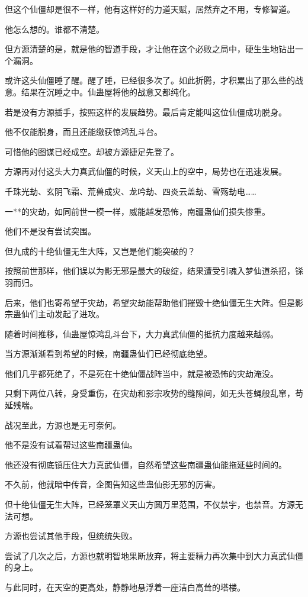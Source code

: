 \begin{this_body}
但这个仙僵却是很不一样，他有这样好的力道天赋，居然弃之不用，专修智道。

他怎么想的。谁都不清楚。

但方源清楚的是，就是他的智道手段，才让他在这个必败之局中，硬生生地钻出一个漏洞。

或许这头仙僵睡了醒。醒了睡，已经很多次了。如此折腾，才积累出了那么些的战意。结果在沉睡之中。仙蛊屋将他的战意又都纯化。

若是没有方源插手，按照这样的发展趋势。最后肯定能叫这位仙僵成功脱身。

他不仅能脱身，而且还能缴获惊鸿乱斗台。

可惜他的图谋已经成空。却被方源捷足先登了。

方源再对付这头大力真武仙僵的时候，义天山上的空中，局势也在迅速发展。

千珠光劫、玄阴飞霜、荒兽成灾、龙吟劫、四炎云盖劫、雪殇劫电……

一**的灾劫，如同前世一模一样，威能越发恐怖，南疆蛊仙们损失惨重。

他们不是没有尝试突围。

但九成的十绝仙僵无生大阵，又岂是他们能突破的？

按照前世那样，他们误以为影无邪是最大的破绽，结果遭受引魂入梦仙道杀招，铩羽而归。

后来，他们也寄希望于灾劫，希望灾劫能帮助他们摧毁十绝仙僵无生大阵。但是影宗蛊仙们主动发起了进攻。

随着时间推移，仙蛊屋惊鸿乱斗台下，大力真武仙僵的抵抗力度越来越弱。

当方源渐渐看到希望的时候，南疆蛊仙们已经彻底绝望。

他们几乎都死绝了，不是死在十绝仙僵战阵当中，就是被恐怖的灾劫淹没。

只剩下两位八转，身受重伤，在灾劫和影宗攻势的缝隙间，如无头苍蝇般乱窜，苟延残喘。

战况至此，方源也是无可奈何。

他不是没有试着帮过这些南疆蛊仙。

他还没有彻底镇压住大力真武仙僵，自然希望这些南疆蛊仙能拖延些时间的。

不久前，他就暗中传音，企图告知这些蛊仙影无邪的厉害。

但十绝仙僵无生大阵，已经笼罩义天山方圆万里范围，不仅禁宇，也禁音。方源无法可想。

方源也尝试其他手段，但统统失败。

尝试了几次之后，方源也就明智地果断放弃，将主要精力再次集中到大力真武仙僵的身上。

与此同时，在天空的更高处，静静地悬浮着一座洁白高耸的塔楼。


\end{this_body}
